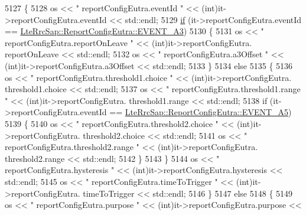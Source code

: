 \begin{DoxyCode}
5127                 \{
5128                   os << \textcolor{stringliteral}{"    reportConfigEutra.eventId  "} <<  (int)it->reportConfigEutra.eventId << 
      std::endl;
5129                   \hyperlink{loss__ITU1238_8m_a419d895abe1313c35fa353c93802647e}{if} (it->reportConfigEutra.eventId == 
      \hyperlink{structns3_1_1LteRrcSap_1_1ReportConfigEutra_ab8152dc095987f60bee2e9115046902fa2899a3564e1c06edb586b1768ccf3acd}{LteRrcSap::ReportConfigEutra::EVENT\_A3})
5130                     \{
5131                       os << \textcolor{stringliteral}{"    reportConfigEutra.reportOnLeave  "} <<  (int)it->reportConfigEutra.
      reportOnLeave << std::endl;
5132                       os << \textcolor{stringliteral}{"    reportConfigEutra.a3Offset  "} <<  (\textcolor{keywordtype}{int})it->reportConfigEutra.a3Offset << 
      std::endl;
5133                     \}
5134                   \textcolor{keywordflow}{else}
5135                     \{
5136                       os << \textcolor{stringliteral}{"    reportConfigEutra.threshold1.choice  "} <<  (int)it->reportConfigEutra.
      threshold1.choice << std::endl;
5137                       os << \textcolor{stringliteral}{"    reportConfigEutra.threshold1.range  "} <<  (\textcolor{keywordtype}{int})it->reportConfigEutra.
      threshold1.range << std::endl;
5138                       \textcolor{keywordflow}{if} (it->reportConfigEutra.eventId == 
      \hyperlink{structns3_1_1LteRrcSap_1_1ReportConfigEutra_ab8152dc095987f60bee2e9115046902fae92d8c286b3b1a6e39edc844df72588c}{LteRrcSap::ReportConfigEutra::EVENT\_A5})
5139                         \{
5140                           os << \textcolor{stringliteral}{"    reportConfigEutra.threshold2.choice  "} <<  (int)it->reportConfigEutra.
      threshold2.choice << std::endl;
5141                           os << \textcolor{stringliteral}{"    reportConfigEutra.threshold2.range  "} <<  (\textcolor{keywordtype}{int})it->reportConfigEutra.
      threshold2.range << std::endl;
5142                         \}
5143                     \}
5144                   os << \textcolor{stringliteral}{"    reportConfigEutra.hysteresis  "} <<  (int)it->reportConfigEutra.hysteresis << 
      std::endl;
5145                   os << \textcolor{stringliteral}{"    reportConfigEutra.timeToTrigger  "} <<  (\textcolor{keywordtype}{int})it->reportConfigEutra.
      timeToTrigger << std::endl;
5146                 \}
5147               \textcolor{keywordflow}{else}
5148                 \{
5149                   os << \textcolor{stringliteral}{"    reportConfigEutra.purpose  "} <<  (int)it->reportConfigEutra.purpose << 

\end{DoxyCode}

